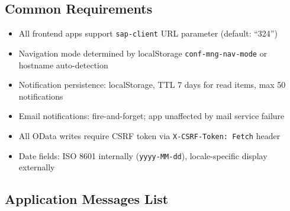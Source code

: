 \documentclass[12pt,a4paper]{report}
\begin{document}
\subsection{Common Requirements}

\begin{itemize}[leftmargin=2em]
  \item All frontend apps support \texttt{sap-client} URL parameter (default: ``324'')
  \item Navigation mode determined by localStorage \texttt{conf-mng-nav-mode} or hostname auto-detection
  \item Notification persistence: localStorage, TTL 7 days for read items, max 50 notifications
  \item Email notifications: fire-and-forget; app unaffected by mail service failure
  \item All OData writes require CSRF token via \texttt{X-CSRF-Token: Fetch} header
  \item Date fields: ISO 8601 internally (\texttt{yyyy-MM-dd}), locale-specific display externally
\end{itemize}

\subsection{Application Messages List}
\end{document}
